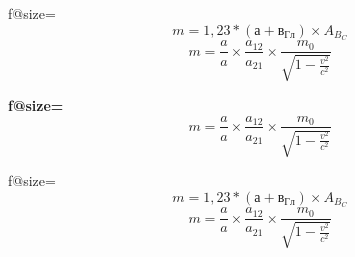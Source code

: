 \documentclass[trace=off]{article}
\begin{document}
  \newpage
  \papergraduate
  \eskdfont \eskdfontsize{14mm} \selectfont\mdseries
  f@size=\f@size
  \[m = 1,23 * \left(а+в_{Гл}\right) \times A_{B_C}\]
  \[m = \frac{a}{a}\times\frac{a_{12}}{a_{21}} \times \frac{m_0}{\sqrt{1-\frac{v^2}{c^2}}}\]

  \eskdfont \eskdfontsize{10mm} \selectfont\bfseries
  f@size=\f@size
  \[m = \frac{a}{a}\times\frac{a_{12}}{a_{21}} \times \frac{m_0}{\sqrt{1-\frac{v^2}{c^2}}}\]

  \eskdfont \eskdfontsize{3.5mm} \selectfont\mdseries
  f@size=\f@size
  \[m = 1,23 * \left(а+в_{Гл}\right) \times A_{B_C}\]
  \[m = \frac{a}{a}\times\frac{a_{12}}{a_{21}} \times \frac{m_0}{\sqrt{1-\frac{v^2}{c^2}}}\]
\end{document}
